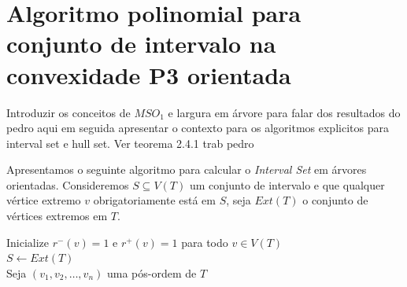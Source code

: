 \chapter{Algoritmo polinomial para conjunto de intervalo na convexidade P3 orientada}\label{5-algoritmos}

Introduzir os conceitos de $MSO_1$ e largura em árvore para falar dos resultados do pedro aqui em seguida apresentar o contexto para os algoritmos explicitos para interval set e hull set. Ver teorema 2.4.1 trab pedro

Apresentamos o seguinte algoritmo para calcular o \emph{Interval Set} em árvores orientadas. Consideremos $S \subseteq V(T)$ um conjunto de intervalo e que qualquer vértice extremo $v$ obrigatoriamente está em $S$, seja $Ext(T)$ o conjunto de vértices extremos em $T$.

\begin{algorithm}
  \SetAlgoLined
  Inicialize $r^-(v) = 1$ e $r^+(v) = 1$ para todo $v \in V(T)$\\
  $S \leftarrow Ext(T)$\\
  Seja $(v_1, v_2, \ldots, v_n)$ uma pós-ordem de $T$\\
  \caption{Interval Set em Árvores orientadas}\label{alg1}
\end{algorithm}

